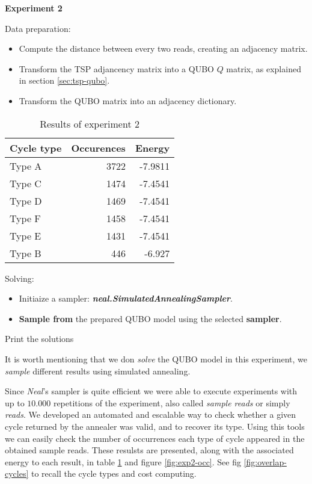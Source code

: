 \begin{algorithm}
	\caption*{\textbf{Experiment 2}}
	
	Data preparation:
	\begin{itemize}
		\item Compute the distance between every two reads, creating an adjacency matrix.
		\item Transform the TSP adjancency matrix into a QUBO $Q$ matrix, as explained in section \ref{sec:tsp-qubo}.
		\item Transform the QUBO matrix into an adjacency dictionary.
	\end{itemize}
	\begin{table}[H]
		\centering
		\begin{tabular}{lrr}
			\textbf{Cycle type} & \textbf{Occurences} & \textbf{Energy} \\
			\hline
			Type A	& 3722	& -7.9811	\\
			Type C	& 1474	& -7.4541	\\
			Type D	& 1469	& -7.4541	\\
			Type F	& 1458	& -7.4541	\\
			Type E	& 1431	& -7.4541	\\
			Type B	& 446	& -6.927                             
		\end{tabular}
		\caption{Results of experiment 2}
		\label{tab:exp2}
	\end{table}
	Solving:
	\begin{itemize}
		\item Initiaize a sampler: \textbf{\emph{neal.SimulatedAnnealingSampler}}.
		\item \textbf{Sample from} the prepared QUBO model using the selected \textbf{sampler}.
	\end{itemize}
	
	Print the solutions
\end{algorithm}

It is worth mentioning that we don \emph{solve} the QUBO model in this experiment, we \emph{sample} different results using simulated annealing.

Since \emph{Neal}'s sampler is quite efficient we were able to execute experiments with up to $10.000$ repetitions of the experiment, also called \emph{sample reads} or simply \emph{reads}. We developed an automated and escalable way to check whether a given cycle returned by the annealer was valid, and to recover its type. Using this tools we can easily check the number of occurrences each type of cycle appeared in the obtained sample reads. These resulsts are presented, along with the associated energy to each result, in table \ref{tab:exp2} and figure \ref{fig:exp2-occ}. See fig \ref{fig:overlap-cycles} to recall the cycle types and cost computing.

